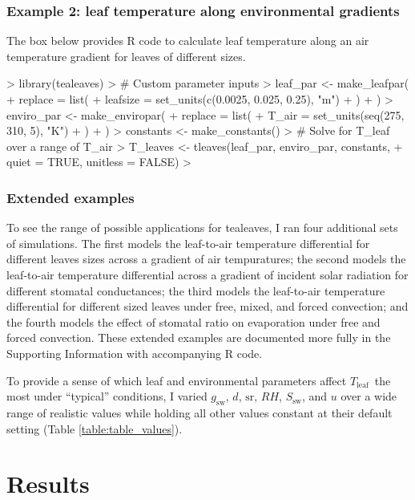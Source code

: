\documentclass[11pt, oneside]{article}
\newcommand{\pkg}[1]{{\fontseries{b}\selectfont #1}}
\newcommand{\tealeaves}{\pkg{tealeaves}}
\newcommand{\tleaf}{$T_\mathrm{leaf}$}
\begin{document}
\subsubsection*{Example 2: leaf temperature along environmental gradients}

The box below provides R code to calculate leaf temperature along an air temperature gradient for leaves of different sizes.

\begin{Schunk}
\begin{Sinput}
>   library(tealeaves)
>   # Custom parameter inputs
>   leaf_par   <- make_leafpar(
+     replace = list(
+       leafsize = set_units(c(0.0025, 0.025, 0.25), "m")
+       )
+   )
>   enviro_par <- make_enviropar(
+     replace = list(
+       T_air = set_units(seq(275, 310, 5), "K")
+       )
+   )
>   constants  <- make_constants()
>   # Solve for T_leaf over a range of T_air
>   T_leaves <- tleaves(leaf_par, enviro_par, constants, 
+                       quiet = TRUE, unitless = FALSE)
> 
\end{Sinput}
\end{Schunk}

\subsubsection*{Extended examples}

To see the range of possible applications for \tealeaves, I ran four additional sets of simulations. The first models the leaf-to-air temperature differential for different leaves sizes across a gradient of air tempuratures; the second models the leaf-to-air temperature differential across a gradient of incident solar radiation for different stomatal conductances; the third models the leaf-to-air temperature differential for different sized leaves under free, mixed, and forced convection; and the fourth models the effect of stomatal ratio on evaporation under free and forced convection. These extended examples are documented more fully in the Supporting Information with accompanying R code. 

To provide a sense of which leaf and environmental parameters affect \tleaf~the most under ``typical'' conditions, I varied $g_\mathrm{sw}$, $d$, $\mathrm{sr}$, $\mathit{RH}$, $S_\mathrm{sw}$, and $u$ over a wide range of realistic values while holding all other values constant at their default setting (Table \ref{table:table_values}).

\section*{Results}
\end{document}
